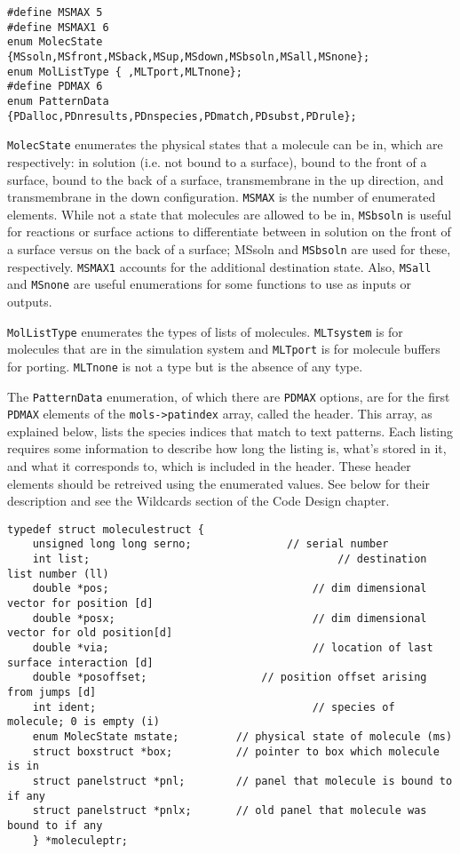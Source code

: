 \documentclass {book}
\newcommand {\ttt} {\texttt}
\begin{document}
\begin{lstlisting}
#define MSMAX 5
#define MSMAX1 6
enum MolecState {MSsoln,MSfront,MSback,MSup,MSdown,MSbsoln,MSall,MSnone};
enum MolListType { ,MLTport,MLTnone};
#define PDMAX 6
enum PatternData {PDalloc,PDnresults,PDnspecies,PDmatch,PDsubst,PDrule};
\end{lstlisting}

\ttt{MolecState} enumerates the physical states that a molecule can be in, which are respectively: in solution (i.e. not bound to a surface), bound to the front of a surface, bound to the back of a surface, transmembrane in the up direction, and transmembrane in the down configuration. \ttt{MSMAX} is the number of enumerated elements. While not a state that molecules are allowed to be in, \ttt{MSbsoln} is useful for reactions or surface actions to differentiate between in solution on the front of a surface versus on the back of a surface; MSsoln and \ttt{MSbsoln} are used for these, respectively. \ttt{MSMAX1} accounts for the additional destination state. Also, \ttt{MSall} and \ttt{MSnone} are useful enumerations for some functions to use as inputs or outputs.

\ttt{MolListType} enumerates the types of lists of molecules. \ttt{MLTsystem} is for molecules that are in the simulation system and \ttt{MLTport} is for molecule buffers for porting. \ttt{MLTnone} is not a type but is the absence of any type.

The \ttt{PatternData} enumeration, of which there are \ttt{PDMAX} options, are for the first \ttt{PDMAX} elements of the \ttt{mols->patindex} array, called the header. This array, as explained below, lists the species indices that match to text patterns. Each listing requires some information to describe how long the listing is, what's stored in it, and what it corresponds to, which is included in the header. These header elements should be retreived using the enumerated values. See below for their description and see the Wildcards section of the Code Design chapter.

\begin{lstlisting}
typedef struct moleculestruct {
	unsigned long long serno;				// serial number
	int list;										// destination list number (ll)
	double *pos;								// dim dimensional vector for position [d]
	double *posx;								// dim dimensional vector for old position[d]
	double *via;								// location of last surface interaction [d]
	double *posoffset;					// position offset arising from jumps [d]
	int ident;									// species of molecule; 0 is empty (i)
	enum MolecState mstate;			// physical state of molecule (ms)
	struct boxstruct *box;			// pointer to box which molecule is in
	struct panelstruct *pnl;		// panel that molecule is bound to if any
	struct panelstruct *pnlx;		// old panel that molecule was bound to if any
	} *moleculeptr;
\end{lstlisting}
\end{document}
